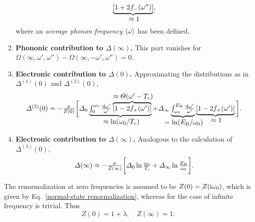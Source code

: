 \begin{enumerate}
\begin{gather*}
        \hypo{[1 + 2 f_-(\omega'')]}{\approx 1},
    \end{gather*}
    where an \emph{average phonon frequency} $\langle\omega\rangle$ has been defined.
    \item \textbf{Phononic contribution to \bm$\Delta(\infty)$.} This part
    vanishes for $\Omega(\infty, \omega', \omega'') - \Omega(\infty, -\omega',
    \omega'') = 0$.
    \item \textbf{Electronic contribution to \bm$\Delta(0)$.} Approximating the
    distributions as in $\Delta^{(1)}(0)$ and $\Delta^{(2)}(0)$,
    \begin{equation*}
        \Delta^{(3)}(0) = -\frac \mu {Z(0)} \bigg[
            \Delta_0 \hypo
                {\int_0^{\omega_0} \frac{\D \omega'}{\omega'}
                \hyper
                    {[1 - 2 f_+(\omega')]}
                    {\approx \Theta(\omega' - T \sub c)}}
                {\approx \ln(\omega_0 / T \sub c)}
            + \Delta_\infty \hypo
                {\int_{\omega_0}^{E \sub B}
                \frac{\D \omega'}{\omega'}}{= \ln(E \sub B / \omega_0)}
            \hypo{[1 - 2 f_+(\omega')]}{\approx 1}
        \bigg].
    \end{equation*}
    \item \textbf{Electronic contribution to \bm$\Delta(\infty)$.} Analogous to
    the calculation of $\Delta^{(3)}(0)$,
    \begin{equation*}
        \Delta(\infty) \approx -\frac \mu {Z(\infty)} \bigg[
            \Delta_0 \ln \frac{\omega_0}{T \sub c}
            + \Delta_\infty \ln \frac{E \sub B}{\omega_0}
        \bigg].
    \end{equation*}
\end{enumerate}

The renormalization at zero frequencies is assumed to be $Z(0) = Z(\mathrm i
\omega_0)$, which is given by Eq.~\ref{normal-state renormalization}, whereas
for the case of infinite frequency is trivial. Thus
%
\begin{equation*}
    Z(0) = 1 + \lambda, \quad Z(\infty) = 1.
\end{equation*}

